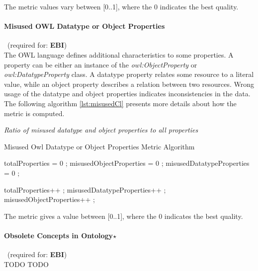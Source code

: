 The metric values vary between  [0..1], where  the 0 indicates the best quality.

\paragraph{Misused OWL Datatype or Object Properties}~(required for: \textbf{EBI})~\\
The OWL language defines additional characteristics to some properties. 
A property can be either an instance of the \textit{owl:ObjectProperty} or \textit{owl:DatatypeProperty} class.
A datatype property relates some resource to a literal value, while an object property describes a relation between two resources.
Wrong usage of the datatype and object properties indicates inconsistencies in the data.
The following algorithm  \ref{lst:misusedCl} presents more details about how the metric is computed.

\begin{mdframed}[style=metricdefinition]
\emph{Ratio of misused datatype and object properties to all properties}
\end{mdframed}

\begin{algorithm}
\caption{Misused Owl Datatype or Object Properties Metric Algorithm} \label{lst:misusedCl}
\begin{algorithmic}[1]
\State totalProperties = 0 ;
\State misusedObjectProperties = 0 ;
\State misusedDatatypeProperties = 0 ;
\EndProcedure

 totalProperties++ ;\EndIf 
{} misusedDatatypeProperties++ ; \EndIf 
{} misusedObjectProperties++ ; \EndIf 
\EndProcedure
\end{algorithmic}
\end{algorithm}

The metric gives a value between [0..1], where  the 0 indicates the best quality.

\paragraph{Obsolete Concepts in Ontology$\star$}~(required for: \textbf{EBI})~\\
TODO TODO

